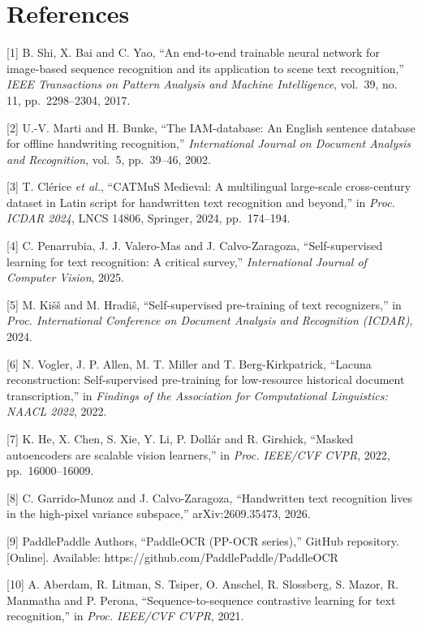 \documentclass[
  12pt,
  a4paper,
]{report}
\begin{document}
\chapter*{References}\label{references}

{[}1{]} B. Shi, X. Bai and C. Yao, ``An end-to-end trainable neural
network for image-based sequence recognition and its application to
scene text recognition,'' \emph{IEEE Transactions on Pattern Analysis
and Machine Intelligence}, vol.~39, no. 11, pp.~2298--2304, 2017.

{[}2{]} U.-V. Marti and H. Bunke, ``The IAM-database: An English
sentence database for offline handwriting recognition,''
\emph{International Journal on Document Analysis and Recognition},
vol.~5, pp.~39--46, 2002.

{[}3{]} T. Clérice \emph{et al.}, ``CATMuS Medieval: A multilingual
large-scale cross-century dataset in Latin script for handwritten text
recognition and beyond,'' in \emph{Proc. ICDAR 2024}, LNCS 14806,
Springer, 2024, pp.~174--194.

{[}4{]} C. Penarrubia, J. J. Valero-Mas and J. Calvo-Zaragoza,
``Self-supervised learning for text recognition: A critical survey,''
\emph{International Journal of Computer Vision}, 2025.

{[}5{]} M. Kišš and M. Hradiš, ``Self-supervised pre-training of text
recognizers,'' in \emph{Proc. International Conference on Document
Analysis and Recognition (ICDAR)}, 2024.

{[}6{]} N. Vogler, J. P. Allen, M. T. Miller and T. Berg-Kirkpatrick,
``Lacuna reconstruction: Self-supervised pre-training for low-resource
historical document transcription,'' in \emph{Findings of the
Association for Computational Linguistics: NAACL 2022}, 2022.

{[}7{]} K. He, X. Chen, S. Xie, Y. Li, P. Dollár and R. Girshick,
``Masked autoencoders are scalable vision learners,'' in \emph{Proc.
IEEE/CVF CVPR}, 2022, pp.~16000--16009.

{[}8{]} C. Garrido-Munoz and J. Calvo-Zaragoza, ``Handwritten text
recognition lives in the high-pixel variance subspace,''
arXiv:2609.35473, 2026.

{[}9{]} PaddlePaddle Authors, ``PaddleOCR (PP-OCR series),'' GitHub
repository. {[}Online{]}. Available:
https://github.com/PaddlePaddle/PaddleOCR

{[}10{]} A. Aberdam, R. Litman, S. Tsiper, O. Anschel, R. Slossberg, S.
Mazor, R. Manmatha and P. Perona, ``Sequence-to-sequence contrastive
learning for text recognition,'' in \emph{Proc. IEEE/CVF CVPR}, 2021.
\end{document}
